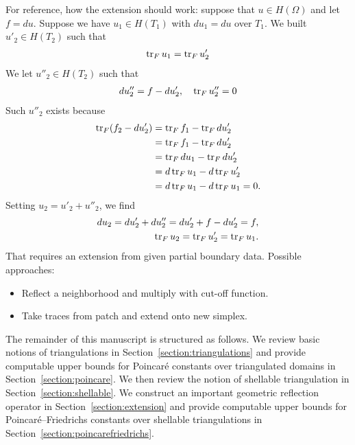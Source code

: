 \documentclass[a4paper]{amsart}
\begin{document}
\begin{remark}
 For reference, how the extension should work:
 suppose that $u \in H(\Omega)$ and let $f = du$.
 Suppose we have $u_1 \in H(T_1)$ with $du_1 = du$ over $T_1$. 
 We built $u'_2 \in H(T_2)$ such that 
 \begin{align*}
    \operatorname{tr}_F u_1 = \operatorname{tr}_F u'_2
 \end{align*}
 We let $u''_2 \in H(T_2)$ such that 
 \begin{align*}
    d u''_2 = f - d u'_2, \quad \operatorname{tr}_F u''_2 = 0
 \end{align*}
 Such $u''_2$ exists because 
 \begin{align*}
  \operatorname{tr}_F( f_2 - d u'_2 ) 
  &= 
  \operatorname{tr}_F f_1 - \operatorname{tr}_F d u'_2
  \\&= 
  \operatorname{tr}_F f_1 - \operatorname{tr}_F d u'_2
  \\&= 
  \operatorname{tr}_F d u_1 - \operatorname{tr}_F d u'_2
  \\&= 
  d \operatorname{tr}_F u_1 - d \operatorname{tr}_F u'_2
  \\&= 
  d \operatorname{tr}_F u_1 - d \operatorname{tr}_F u_1
  = 0
  .
 \end{align*}
 Setting $u_2 = u'_2 + u''_2$, we find 
 \begin{align*}
    d u_2 = d u'_2 + d u''_2 = d u'_2 + f - d u'_2 = f,
    \\
    \operatorname{tr}_F u_2 = \operatorname{tr}_F u'_2 = \operatorname{tr}_F u_1.
 \end{align*}
 That requires an extension from given partial boundary data. 
 Possible approaches:
 \begin{itemize}
  \item Reflect a neighborhood and multiply with cut-off function.
  \item Take traces from patch and extend onto new simplex. 
 \end{itemize}

\end{remark}

The remainder of this manuscript is structured as follows.
We review basic notions of triangulations in Section~\ref{section:triangulations} and provide computable upper bounds for Poincar\'e constants over triangulated domains in Section~\ref{section:poincare}.
We then review the notion of shellable triangulation in Section~\ref{section:shellable}.
We construct an important geometric reflection operator in Section~\ref{section:extension}
and provide computable upper bounds for Poincar\'e--Friedrichs constants over shellable triangulations in Section~\ref{section:poincarefriedrichs}.
\end{document}
